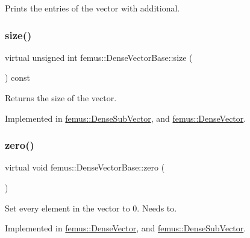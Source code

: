Prints the entries of the vector with additional. 

\mbox{\label{classfemus_1_1_dense_vector_base_a642849a48ad4800945952af17c1e30c9}} 
\subsubsection{\texorpdfstring{size()}{size()}}
{\footnotesize\ttfamily virtual unsigned int femus\+::\+Dense\+Vector\+Base\+::size (\begin{DoxyParamCaption}{ }\end{DoxyParamCaption}) const\hspace{0.3cm}{\ttfamily [pure virtual]}}

\begin{DoxyReturn}{Returns}
the size of the vector. 
\end{DoxyReturn}


Implemented in \mbox{\hyperlink{classfemus_1_1_dense_sub_vector_ac7267bc849d12ec7c84481a9fa9a87ce}{femus\+::\+Dense\+Sub\+Vector}}, and \mbox{\hyperlink{classfemus_1_1_dense_vector_ac7d42a76bf12cb82076b8c7444cbc9ee}{femus\+::\+Dense\+Vector}}.

\mbox{\label{classfemus_1_1_dense_vector_base_abd1b93469867212f796c7b86d242c550}} 
\subsubsection{\texorpdfstring{zero()}{zero()}}
{\footnotesize\ttfamily virtual void femus\+::\+Dense\+Vector\+Base\+::zero (\begin{DoxyParamCaption}{ }\end{DoxyParamCaption})\hspace{0.3cm}{\ttfamily [pure virtual]}}



Set every element in the vector to 0. Needs to. 



Implemented in \mbox{\hyperlink{classfemus_1_1_dense_vector_ae2eafd9df7f6ae8fe75165a3eb675a4b}{femus\+::\+Dense\+Vector}}, and \mbox{\hyperlink{classfemus_1_1_dense_sub_vector_a20fd1054159ce0a69af4d28199dd704f}{femus\+::\+Dense\+Sub\+Vector}}.



